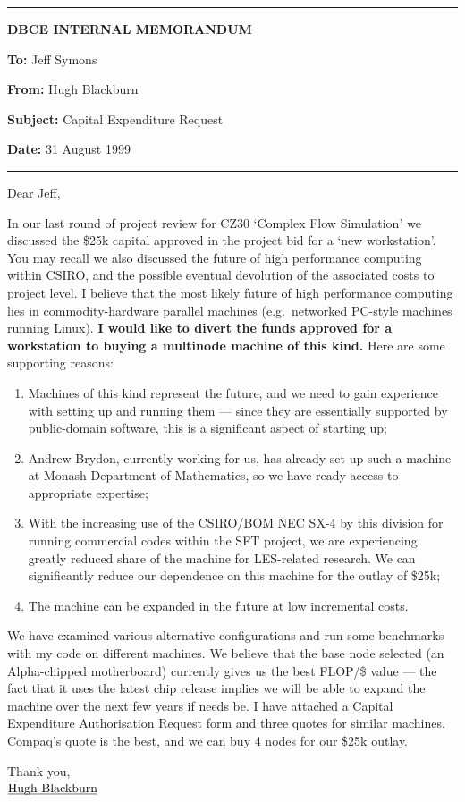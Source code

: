 \documentclass[12pt]{article}
\newenvironment{memohead}{
	\noindent
	\begin{list}%
	{ }
	{
	\setlength{\parskip}{0ex}
	\setlength{\partopsep}{0ex}
	\setlength{\topskip}{0ex}
	\setlength{\labelwidth}{5em}
	\setlength{\labelsep}{1em}
	\setlength{\leftmargin}{6em}
	}
}{\end{list}}
\def\undertext#1{$\underline{\smash{\hbox{#1}}}$}
\begin{document}
\noindent
\rule{\textwidth}{0.25mm}
\begin{center}
\bf DBCE INTERNAL MEMORANDUM
\end{center}
\begin{memohead}{}
\item[\bf To:\hfill]
Jeff Symons 
\item[\bf From:\hfill]
Hugh Blackburn
\item[\bf Subject:\hfill]
Capital Expenditure Request 
\item[\bf Date:\hfill]
31 August 1999
\end{memohead}
\noindent
\rule{\textwidth}{0.25mm}
\vspace*{1ex}


\thispagestyle{empty}

Dear Jeff,

In our last round of project review for CZ30 `Complex Flow Simulation'
we discussed the \$25k capital approved in the project bid for a `new
workstation'.  You may recall we also discussed the future of high
performance computing within CSIRO, and the possible eventual
devolution of the associated costs to project level.  I believe that
the most likely future of high performance computing lies in
commodity-hardware parallel machines (e.g.\ networked PC-style
machines running Linux).  \textbf{I would like to divert the funds
approved for a workstation to buying a multinode machine of this
kind.}  Here are some supporting reasons:
\begin{enumerate}
\item
Machines of this kind represent the future, and we need to gain
experience with setting up and running them --- since they are
essentially supported by public-domain software, this is a significant
aspect of starting up;
\item
Andrew Brydon, currently working for us, has already set up such a
machine at Monash Department of Mathematics, so we have ready access
to appropriate expertise;
\item
With the increasing use of the CSIRO/BOM NEC SX-4 by this division for
running commercial codes within the SFT project, we are experiencing
greatly reduced share of the machine for LES-related research.  We can
significantly reduce our dependence on this machine for the
outlay of \$25k;
\item
The machine can be expanded in the future at low incremental costs.
\end{enumerate}

We have examined various alternative configurations and run some
benchmarks with my code on different machines.  We believe that the
base node selected (an Alpha-chipped motherboard) currently gives us
the best FLOP/\$ value --- the fact that it uses the latest chip
release implies we will be able to expand the machine over the next
few years if needs be.  I have attached a Capital Expenditure
Authorisation Request form and three quotes for similar machines.
Compaq's quote is the best, and we can buy 4 nodes for our \$25k
outlay.

Thank you,


\vspace{20mm}
\undertext{Hugh Blackburn}
\end{document}
